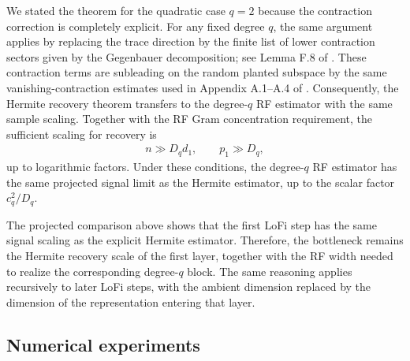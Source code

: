 We stated the theorem for the quadratic case $q=2$ because the contraction
correction is completely explicit. For any fixed degree $q$, the same argument
applies by replacing the trace direction by the finite list of lower
contraction sectors given by the Gegenbauer decomposition; see Lemma F.8 of
\cite{wen2025when}. These contraction terms are subleading on the random
planted subspace by the same vanishing-contraction estimates used in Appendix
A.1--A.4 of \cite{tabanelli2026deep}. Consequently, the Hermite recovery
theorem transfers to the degree-$q$ RF estimator with the same sample scaling.
Together with the RF Gram concentration requirement, the sufficient scaling for
recovery is
\begin{align}
    n\gg D_q d_1,
    \qquad
    p_1\gg D_q,
\end{align}
up to logarithmic factors. Under these conditions, the degree-$q$ RF estimator
has the same projected signal limit as the Hermite estimator, up to the scalar
factor $c_q^2/D_q$.

The projected comparison above shows that the first LoFi step
has the same signal scaling as the explicit Hermite estimator. Therefore, the
bottleneck remains the Hermite recovery scale of the first layer, together with the RF width needed to realize the corresponding degree-$q$ block. The same reasoning applies recursively to later LoFi steps, with the ambient dimension replaced by the dimension of the representation entering that layer.

\subsection{Numerical experiments}
\label{2605:app:rf-numerics}


